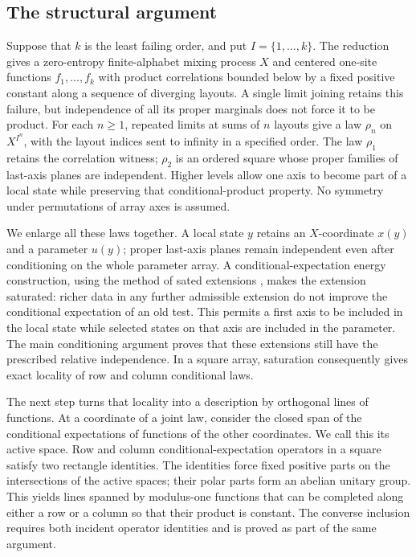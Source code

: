 \subsection*{The structural argument}

Suppose that $k$ is the least failing order, and put $I=\{1,\ldots,k\}$.
The reduction gives a zero-entropy finite-alphabet mixing process $X$ and
centered one-site functions $f_1,\ldots,f_k$ with product correlations
bounded below by a fixed positive constant along a sequence of diverging
layouts. A single limit joining retains this failure, but independence
of all its proper marginals does not force it to be product. For each
$n\ge1$, repeated limits at sums of $n$ layouts give a law $\rho_n$
on $X^{I^n}$, with the layout indices sent to infinity in a specified
order. The law $\rho_1$ retains the correlation witness; $\rho_2$ is
an ordered square whose proper families of last-axis planes are
independent. Higher levels allow one axis to become part of a local
state while preserving that conditional-product property. No symmetry
under permutations of array axes is assumed.

We enlarge all these laws together. A local state $y$ retains an
$X$-coordinate $x(y)$ and a parameter $u(y)$; proper last-axis planes
remain independent even after conditioning on the whole parameter array.
A conditional-expectation energy construction, using the method of
sated extensions \cite{Austin2015Sated}, makes the extension saturated:
richer data in any further admissible extension do not
improve the conditional expectation of an old test. This permits a first
axis to be included in the local state while selected states on that axis
are included in the parameter. The main conditioning argument proves that
these extensions still have the prescribed relative independence. In a
square array, saturation consequently gives exact locality of row and
column conditional laws.

The next step turns that locality into a description by orthogonal lines
of functions. At a coordinate of a joint law, consider the closed span of
the conditional expectations of functions of the other coordinates.
We call this its active space. Row and column conditional-expectation
operators in a square satisfy two rectangle identities. The identities
force fixed positive parts on the intersections of the active spaces;
their polar parts form an abelian unitary group. This yields lines spanned
by modulus-one functions that can be completed along either a row or a
column so that their product is constant. The converse inclusion requires
both incident operator identities and is proved as part of the same argument.

